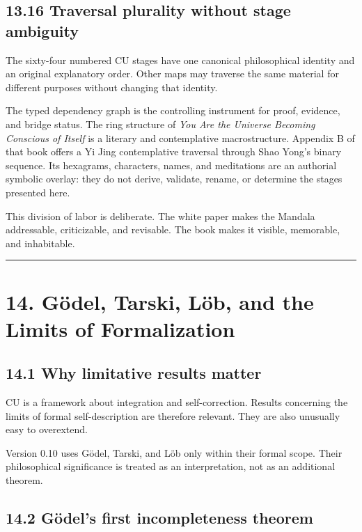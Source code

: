 \documentclass[
  11pt,
]{article}
\begin{document}
\subsection{13.16 Traversal plurality without stage
ambiguity}\label{traversal-plurality-without-stage-ambiguity}

The sixty-four numbered CU stages have one canonical philosophical
identity and an original explanatory order. Other maps may traverse the
same material for different purposes without changing that identity.

The typed dependency graph is the controlling instrument for proof,
evidence, and bridge status. The ring structure of \emph{You Are the
Universe Becoming Conscious of Itself} is a literary and contemplative
macrostructure. Appendix B of that book offers a Yi Jing contemplative
traversal through Shao Yong's binary sequence. Its hexagrams,
characters, names, and meditations are an authorial symbolic overlay:
they do not derive, validate, rename, or determine the stages presented
here.

This division of labor is deliberate. The white paper makes the Mandala
addressable, criticizable, and revisable. The book makes it visible,
memorable, and inhabitable.

\begin{center}\rule{0.5\linewidth}{0.5pt}\end{center}

\section{14. Gödel, Tarski, Löb, and the Limits of
Formalization}\label{guxf6del-tarski-luxf6b-and-the-limits-of-formalization}

\subsection{14.1 Why limitative results
matter}\label{why-limitative-results-matter}

CU is a framework about integration and self-correction. Results
concerning the limits of formal self-description are therefore relevant.
They are also unusually easy to overextend.

Version 0.10 uses Gödel, Tarski, and Löb only within their formal scope.
Their philosophical significance is treated as an interpretation, not as
an additional theorem.

\subsection{14.2 Gödel's first incompleteness
theorem}\label{guxf6dels-first-incompleteness-theorem}
\end{document}
